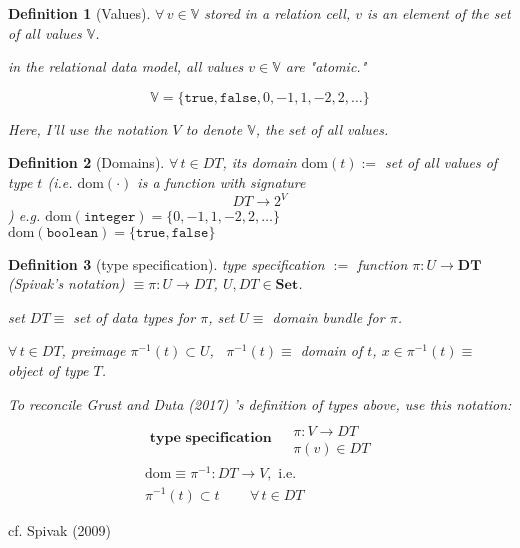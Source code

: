 \documentclass[10pt]{amsart}
\newtheorem{definition}{Definition}
\begin{document}
\begin{multicols*}{2}
\begin{definition}[Values]
$\forall \, v \in \mathbb{V}$ stored in a relation cell, $v$ is an element of the set of all values $\mathbb{V}$. 

in the relational data model, all values $v\in \mathbb{V}$ are "atomic."

\[
\mathbb{V} = \lbrace \texttt{true}, \texttt{false}, 0, -1, 1, -2, 2 , \dots \rbrace
\]	

Here, I'll use the notation $V$ to denote $\mathbb{V}$, the set of all values.
\end{definition}

\begin{definition}[Domains]
	$\forall \, t \in DT$, its domain $\text{dom}(t) := $ set of all values of type $t$ (i.e. $\text{dom}(\cdot)$ is a function with signature 
	\[
	DT \to 2^V
	\])
	e.g. $\text{dom}(\texttt{integer}) = \lbrace 0 , -1, 1, -2, 2, \dots \rbrace $ \\
	$\text{dom}(\texttt{boolean}) = \lbrace \texttt{true}, \texttt{false} \rbrace$ 
\end{definition} 

\begin{definition}[type specification]
	type specification $:= $ function $\pi : U \to \mathbf{DT}$ (Spivak's notation) $ \equiv \pi : U \to DT$, $U, DT \in \textbf{Set}$.
	
	set $DT \equiv $ set of data types for $\pi$, set $U \equiv $ domain bundle for $\pi$.
	
	$\forall \, t \in DT$, preimage $\pi^{-1}(t) \subset U$, \, $\pi^{-1}(t) \equiv $ domain of $t$, $x \in \pi^{-1}(t) \equiv $ object of type $T$.

	To reconcile Grust and Duta (2017) \cite{GrDu2017}'s definition of types above, use this notation:
	\begin{equation}
	\boxed{
	\begin{gathered}
	\textbf{ type specification } \begin{aligned} & \quad \\ 
	& \pi : V \to DT \\ 
	& \pi(v) \in DT \end{aligned} \\
	\text{dom} \equiv \pi^{-1}: DT \to V, \text{ i.e. } \\
	\pi^{-1}(t) \subset t \qquad \, \forall \, t \in DT  
	\end{gathered}}
	\end{equation}
\end{definition}
	cf. Spivak (2009) \cite{Spiv2009}


\end{multicols*}
\end{document}
